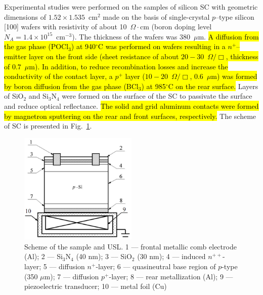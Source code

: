\documentclass[sn-mathphys]{sn-jnl}%
\theoremstyle{thmstyleone}%
\theoremstyle{thmstyletwo}%
\theoremstyle{thmstylethree}%
\begin{document}
Experimental studies were performed on the samples of silicon SC with geometric dimensions of $1.52\times1.535$~cm$^2$ made on the basis of single-crystal  $p$--type silicon [100] wafers with resistivity of about 10~$\Omega\cdot$cm
(boron doping level  $N_A=1.4\times10^{15}$~cm$^{-3}$).
The thickness of the wafers was 380~$\mu$m.
\hl{ A diffusion from the gas phase (POCl$_3$) at 940$^\circ$C was performed on wafers resulting in a $n^+$--emitter layer on
the front side (sheet resistance of about $20-30$~$\Omega/\Box$, thickness of $0.7$~$\mu$m).
In addition, to reduce recombination losses and increase the conductivity of the contact layer,
a $p^+$ layer ($10-20$~$\Omega/\Box$, $0.6$~$\mu$m) was formed by boron diffusion from
the gas phase (BCl$_3$) at 985$^\circ$C on the rear surface.}
Layers of SiO$_2$ and Si$_3$N$_4$ were formed on the surface of the SC to passivate the surface and reduce optical reflectance.
\hl{ The solid and grid aluminum contacts were formed by magnetron sputtering on the rear and front surfaces, respectively.}
The scheme of SC is presented in Fig.~\ref{figChem}.
\begin{figure}
\centering
\includegraphics[width=0.5\textwidth]{Fig1}
\caption{Scheme of the sample and USL.
1 –-- frontal metallic comb electrode (Al);
2 --– Si$_3$N$_4$ (40 nm);
3 –-- SiO$_2$ (30 nm);
4 –-- induced $n^{++}$-layer;
5 –-- diffusion $n^+$-layer;
6 –-- quasineutral base region of $p$-type (350 $\mu$m);
7 –-- diffusion $p^+$-layer;
8 –-- rear metallization (Al);
9 –-- piezoelectric transducer;
10 –-- metal foil (Cu)}
\label{figChem}       %
\end{figure}
\end{document}
